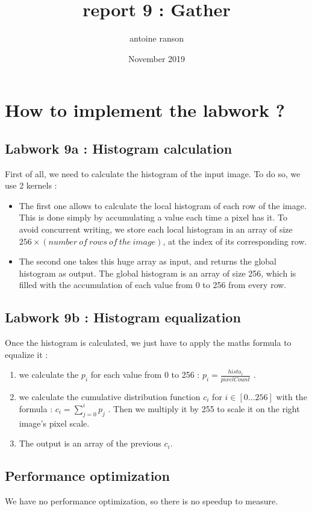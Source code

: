\documentclass{article}
\title{report 9 : Gather}
\author{antoine ranson }
\date{November 2019}
\begin{document}
 

\maketitle 

\section{How to implement the labwork ?} 
\subsection{Labwork 9a : Histogram calculation}

First of all, we need to calculate the histogram of the input image. To do so, we use 2 kernels : 
\begin{itemize} 
\item The first one allows to calculate the local histogram of each row of the image. This is 
done simply by accumulating a value each time a pixel has it. \newline
To avoid concurrent writing, we store each local histogram in an array of size $256\times (number\ of\ rows\ of\ the\ image)$, at the index of its corresponding row. 
\item The second one takes this huge array as input, and returns the global histogram as output. The global histogram is an array of size 256, which is filled with the accumulation of each value from 0 to 256 from every row. 
\end{itemize} 

\subsection{Labwork 9b : Histogram equalization} 

Once the histogram is calculated, we just have to apply the maths formula to equalize it : 
\begin{enumerate} \item we calculate the $p_i$ for each value from 0 to 256 : $p_i = \frac{histo_i}{pixelCount}$ . 
\item we calculate the cumulative distribution function $c_i$ for $i\in[0...256]$ with the formula : $c_i = \displaystyle\sum_{j=0}^i{p_j}$ . Then we multiply it by 255 to scale it on the right image's pixel scale. 
\item The output is an array of the previous $c_i$. 
\end{enumerate} 

\subsection{Performance optimization} 

We have no performance optimization, so there is no speedup to measure. 
\end{document}

